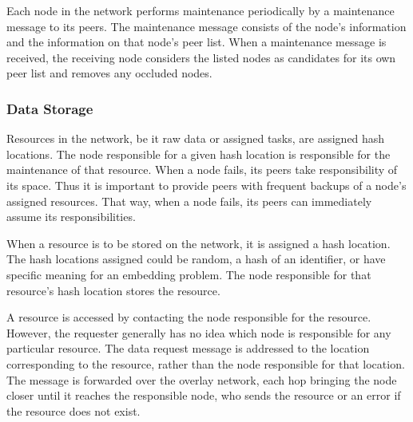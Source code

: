 \documentclass{article}
\begin{document}
Each node in the network performs maintenance periodically by a maintenance message to its peers. The maintenance message consists of the node's information and the information on that node's peer list. When a maintenance message is received, the receiving node considers the listed nodes as candidates for its own peer list and removes any occluded nodes. 


\subsubsection*{Data Storage}
Resources in the network, be it raw data or assigned tasks, are assigned hash locations. The node responsible for a given hash location is responsible for the maintenance of that resource. When a node fails, its peers take responsibility of its space. Thus it is important to provide peers with frequent backups of a node's assigned resources.  That way, when a node fails, its peers can immediately assume its responsibilities.

When a resource is to be stored on the network, it is assigned a hash location. The hash locations assigned could be random, a hash of an identifier, or have specific meaning for an embedding problem. The node responsible for that resource's hash location stores the resource.

A resource is accessed by contacting the node responsible for the resource.  However, the requester generally has no idea which node is responsible for any particular resource.  The data request message is addressed to the location corresponding to the resource, rather than the node responsible for that location.  The message is forwarded over the overlay network, each hop bringing the node closer until it reaches the responsible node, who sends the resource or an error if the resource does not exist.

 

  
  


{\footnotesize


}
\end{document}
